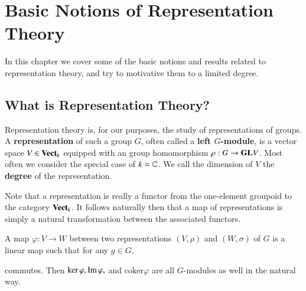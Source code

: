 %
%
%
\chapter{Basic Notions of Representation Theory}
\label{basic} %

In this chapter we cover some of the basic notions and results related to representation theory, and try to motivative them to a limited degree.

\section{What is Representation Theory?}

Representation theory is, for our purposes, the study of representations of groups. A \textbf{representation} of such a group $G$, often called a \textbf{left $G$-module}, is a vector space $V \in \normalfont\textbf{Vect}_{k}$ equipped with an group homomorphism $\rho:G\rightarrow \mathbf{GL} V$. Most often we consider the special case of $k = \mathbb C$. We call the dimension of $V$ the \textbf{degree} of the representation.

Note that a representation is really a functor from the one-element groupoid to the category $\normalfont\textbf{Vect}_{k}$. It follows naturally then that a map of representations is simply a natural transformation between the associated functors.

\begin{definition}
    A map $\varphi:V\rightarrow W$ between two representations $(V,\rho)$ and $(W,\sigma)$ of $G$ is a linear map such that for any $g\in G$,
    \begin{center}
    \end{center}
    commutes. Then $\ker\varphi,\operatorname{Im}\varphi,$ and $\text{coker}\varphi$ are all $G$-modules as well in the natural way.
\end{definition}

